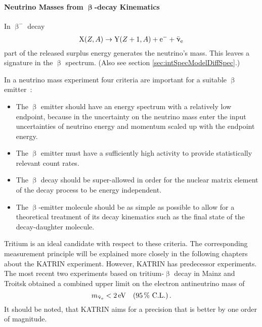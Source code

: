 \paragraph{Neutrino Masses from $\boldsymbol{\upbeta}$-decay Kinematics} 
In $\upbeta^-$ decay
\begin{equation}
    \ce{X}(Z,A) \rightarrow \ce{Y}(Z+1,A) + \ce{e^-} + \aeneutrino
\end{equation}
part of the released surplus energy generates the neutrino's mass. This leaves a signature in the $\upbeta$ spectrum. (Also see section \ref{sec:intSpecModelDiffSpec}.) \begin{samepage} In a neutrino mass experiment four criteria  are important for a suitable $\upbeta$ emitter~\cite{Otten:2008zz}:
\begin{itemize}
	\item The $\upbeta$ emitter should have an energy spectrum with a relatively low endpoint, because in the uncertainty on the neutrino mass enter the input uncertainties of neutrino energy and	momentum scaled up with the endpoint energy.
	\item The $\upbeta$ emitter must have a sufficiently high activity to provide statistically relevant count rates.
	\item The $\upbeta$ decay should be super-allowed in order for the nuclear matrix element of the decay process to be energy independent.
	\item The $\upbeta$-emitter molecule should be as simple as possible to allow for a theoretical treatment of its decay kinematics such as the final state of the decay-daughter molecule.
\end{itemize}
\end{samepage}
Tritium is an ideal candidate with respect to these criteria\cite{Otten:2008zz}. The corresponding measurement principle will be explained more closely in the following chapters about the KATRIN experiment. However, KATRIN has predecessor experiments. The most recent two experiments based on tritium-$\upbeta$ decay in Mainz and Troitsk obtained a combined upper limit on the electron antineutrino mass of \cite{Kraus2005, Aseev:2011dq, ReviewOfParticlePhysics}
\begin{equation*}
    m_{\bar{\upnu}_{\mathrm{e}}} < \SI{2}{eV} \quad (\SI{95}{\percent} \text{ C.L.}) \text{\,.} 
\end{equation*}
It should be noted, that KATRIN aims for a precision that is better by one order of magnitude.
\FloatBarrier